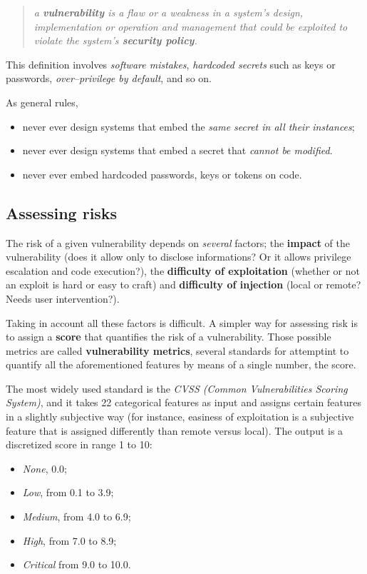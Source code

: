 \documentclass[10pt]{extreport}
\begin{document}
\begin{quote}
    \emph{a \textbf{vulnerability} is a flaw or a weakness in a system's
    design, implementation or operation and management that could be exploited
to violate the system's \textbf{security policy}.}
\end{quote}

This definition involves \emph{software mistakes}, \emph{hardcoded secrets}
such as keys or passwords, \emph{over--privilege by default}, and so on.

As general rules,
\begin{itemize}
    \item never ever design systems that embed the \emph{same secret in all
        their instances};
    \item never ever design systems that embed a secret that \emph{cannot be
        modified}.
    \item never ever embed hardcoded passwords, keys or tokens on code.
\end{itemize}

\subsection{Assessing risks}

The risk of a given vulnerability depends on \emph{several} factors; the
\textbf{impact} of the vulnerability (does it allow only to disclose
informations? Or it allows privilege escalation and code execution?), the \textbf{difficulty of exploitation} (whether or not an exploit is hard or easy to craft) and \textbf{difficulty of injection} (local or remote? Needs user intervention?).

Taking in account all these factors is difficult. A simpler way for assessing
risk is to assign a \textbf{score} that quantifies the risk of a vulnerability.
Those possible metrics are called \textbf{vulnerability metrics}, several
standards for attemptint to quantify all the aforementioned features by means
of a single number, the score. 

The most widely used standard is the \emph{CVSS (Common Vulnerabilities Scoring
System)}, and it takes 22 categorical features as input and assigns certain
features in a slightly subjective way (for instance, easiness of exploitation
is a subjective feature that is assigned differently than remote versus local).
The output is a discretized score in range 1 to 10:
\begin{itemize}
    \item \emph{None}, 0.0;
    \item \emph{Low}, from 0.1 to 3.9;
    \item \emph{Medium}, from 4.0 to 6.9;
    \item \emph{High}, from 7.0 to 8.9;
    \item \emph{Critical} from 9.0 to 10.0.
\end{itemize}
\end{document}
